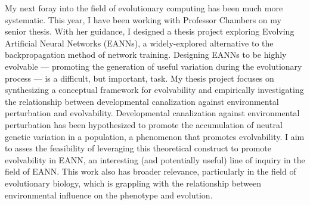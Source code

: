 My next foray into the field of evolutionary computing has been much more systematic.
This year, I have been working with Professor Chambers on my senior thesis.
With her guidance, I designed a thesis project exploring Evolving Artificial Neural Networks (EANNs), a widely-explored alternative to the backpropagation method of network training.
Designing EANNs to be highly evolvable  ---  promoting the generation of useful variation during the evolutionary process  ---  is a difficult, but important, task.
My thesis project focuses on synthesizing a conceptual framework for evolvability and empirically investigating the relationship between developmental canalization against environmental perturbation and evolvability.
Developmental canalization against environmental perturbation has been hypothesized to promote the accumulation of neutral genetic variation in a population, a phenomenon that promotes evolvability.
I aim to asses the feasibility of leveraging this theoretical construct to promote evolvability in EANN, an interesting (and potentially useful) line of inquiry in the field of EANN.
This work also has broader relevance, particularly in the field of evolutionary biology, which is grappling with the relationship between environmental influence on the phenotype and evolution.
